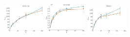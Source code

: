 \documentclass[a4paper]{report}
\newcommand{\wratio}{0.16}
\begin{document}
\includegraphics[width=\wratio\textwidth]{maxcut/SNAP_GR/fs_snap_gr}\hfill
\includegraphics[width=\wratio\textwidth]{maxcut/SPANISH/fs_spanish}\hfill
\includegraphics[width=\wratio\textwidth]{maxcut/STELZL/fs_stelzl}\hfill
\end{document}
